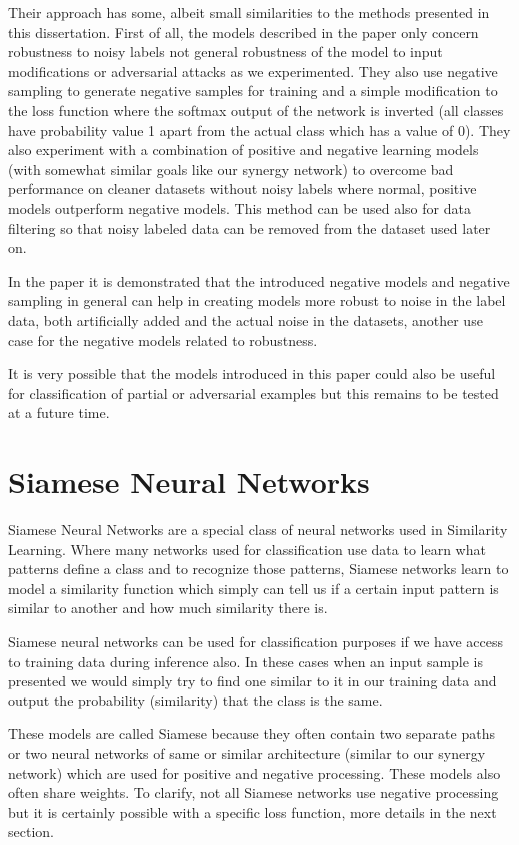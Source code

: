 \documentclass[b5paper]{book}
\begin{document}
Their approach has some, albeit small similarities to the methods presented in this dissertation. First of all, the models described in the paper only concern robustness to noisy labels not general robustness of the model to input modifications or adversarial attacks as we experimented. They also use negative sampling to generate negative samples for training and a simple modification to the loss function where the softmax output of the network is inverted (all classes have probability value 1 apart from the actual class which has a value of 0). They also experiment with a combination of positive and negative learning models (with somewhat similar goals like our synergy network) to overcome bad performance on cleaner datasets without noisy labels where normal, positive models outperform negative models. This method can be used also for data filtering so that noisy labeled data can be removed from the dataset used later on.

In the paper it is demonstrated that the introduced negative models and negative sampling in general can help in creating models more robust to noise in the label data, both artificially added and the actual noise in the datasets, another use case for the negative models related to robustness.

It is very possible that the models introduced in this paper could also be useful for classification of partial or adversarial examples but this remains to be tested at a future time.

\chapter{Siamese Neural Networks}

Siamese Neural Networks are a special class of neural networks used in Similarity Learning. Where many networks used for classification use data to learn what patterns define a class and to recognize those patterns, Siamese networks learn to model a similarity function which simply can tell us if a certain input pattern is similar to another and how much similarity there is.

Siamese neural networks can be used for classification purposes if we have access to training data during inference also. In these cases when an input sample is presented we would simply try to find one similar to it in our training data and output the probability (similarity) that the class is the same. 

These models are called Siamese because they often contain two separate paths or two neural networks of same or similar architecture (similar to our synergy network) which are used for positive and negative processing. These models also often share weights. To clarify, not all Siamese networks use negative processing but it is certainly possible with a specific loss function, more details in the next section.
\end{document}
